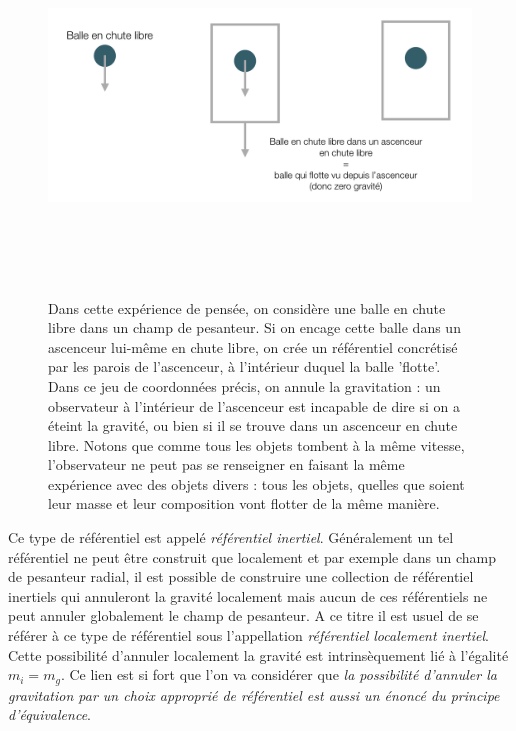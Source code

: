 \begin{figure}[htbp]
	\centering
		\includegraphics[height=10cm]{figs/ascenceur.png}
	\caption[Annulation du champ de pesanteur]{Dans cette expérience de pensée, on considère une balle en chute libre dans un champ de pesanteur. Si on encage cette balle dans un ascenceur lui-même en chute libre, on crée un référentiel concrétisé par les parois de l'ascenceur, à l'intérieur duquel la balle 'flotte'. Dans ce jeu de coordonnées précis, on annule la gravitation : un observateur à l'intérieur de l'ascenceur est incapable de dire si on a éteint la gravité, ou bien si il se trouve dans un ascenceur en chute libre. Notons que comme tous les objets tombent à la même vitesse, l'observateur ne peut pas se renseigner en faisant la même expérience avec des objets divers : tous les objets, quelles que soient leur masse et leur composition vont flotter de la même manière. }
	\label{f:ascenceur}
\end{figure}


Ce type de référentiel est appelé \textit{référentiel inertiel}. Généralement un tel référentiel ne peut être construit que localement et par exemple dans un champ de pesanteur radial, il est possible de construire une collection de référentiel inertiels qui annuleront la gravité localement mais aucun de ces référentiels ne peut annuler globalement le champ de pesanteur. A ce titre il est usuel de se référer à ce type de référentiel sous l'appellation \textit{référentiel localement inertiel}. Cette possibilité d'annuler localement la gravité est intrinsèquement lié à l'égalité $m_i=m_g$. Ce lien est si fort que l'on va considérer que \textit{la possibilité d'annuler la gravitation par un choix approprié de référentiel est aussi un énoncé du principe d'équivalence}. 

